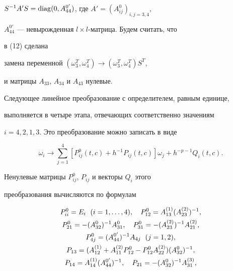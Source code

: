 \begin{pf}
$S^{-1}A'S=\operatorname{diag}(0,A^{0'}_{44})$, где $A'=(A^0_{ij})_{i,j=3,4}$, 


$A^{0'}_{44}$ --- невырожденная $l\times l$-матрица. Будем считать, что 


в (12) сделана 


замена переменной $(\omega^T_3,\omega^T_4)\to(\omega^T_3,\omega^T_4)S^T$,


и матрицы $A_{33}$, $A_{34}$ и $A_{43}$ нулевые. 


 


Следующее линейное преобразование с определителем, равным единице, 


выполняется в четыре этапа, отвечающих соответственно значениям 


$i=4,2,1,3$. Это преобразование можно записать в виде 


$$ 


\omega_i\to\sum^4_{j=1}[P^0_{ij}(t,c)+h^{-1}P_{ij}(t,c)] 


\omega_j+h^{-p-1}Q_i(t,c). 


$$ 


Ненулевые матрицы $P^0_{ij}$, $P_{ij}$ и векторы $Q_i$ этого 


преобразования вычисляются по формулам 


\begin{gather*} 


\allowdisplaybreaks 


P^0_{ii}=E_i \ \; (i=1,\dotsc,4),\quad 


P^0_{12}=A^{(1)}_{13}(A^{(2)}_{23})^{-1},\\ 


% 


P^0_{21}=-(A^0_{32})^{-1}A^0_{31},\quad 


P^0_{31}=-(A^{(2)}_{23})^{-1}A^{(2)}_{21},\\ 


% 


P^0_{4j}=(A^{0'}_{44})^{-1}A_{4j} \ \; (j=1,2), \\ 


% 


P_{13}=(A^{(1)}_{12}+A^{(2)}_{11}P^0_{12}- 


P^0_{12}A^{(2)}_{22})(A^0_{32})^{-1}, \\ 


% 


P_{14}=A^{(1)}_{14}(A^{0{}'}_{44})^{-1},\quad 


P_{21}=-(A^0_{32})^{-1}A^{(3)}_{31},\\ 



\end{gather*}
\end{pf}
